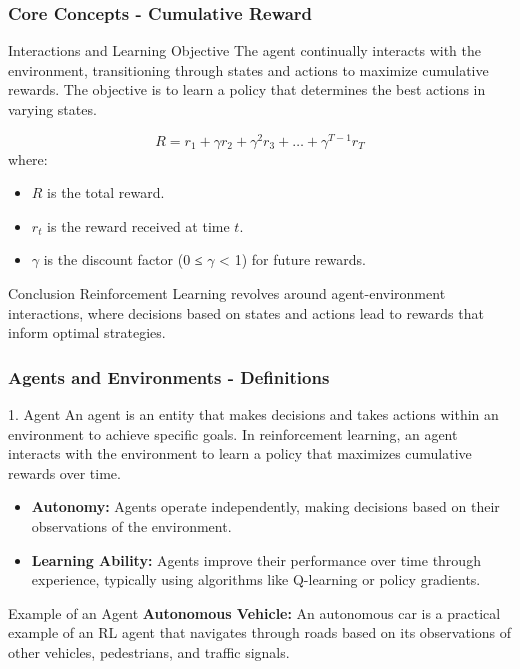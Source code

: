 \documentclass[aspectratio=169]{beamer}
\begin{document}
\begin{frame}[fragile]
    \frametitle{Core Concepts - Cumulative Reward}
    \begin{block}{Interactions and Learning Objective}
        The agent continually interacts with the environment, transitioning through states and actions to maximize cumulative rewards. The objective is to learn a policy that determines the best actions in varying states.
    \end{block}
    
    \begin{equation}
        R = r_1 + \gamma r_2 + \gamma^2 r_3 + \ldots + \gamma^{T-1} r_T
    \end{equation}
    where:
    \begin{itemize}
        \item \( R \) is the total reward.
        \item \( r_t \) is the reward received at time \( t \).
        \item \( \gamma \) is the discount factor (0 ≤ $\gamma$ < 1) for future rewards.
    \end{itemize}
    
    \begin{block}{Conclusion}
        Reinforcement Learning revolves around agent-environment interactions, where decisions based on states and actions lead to rewards that inform optimal strategies.
    \end{block}
\end{frame}

\begin{frame}[fragile]
    \frametitle{Agents and Environments - Definitions}
    
    \begin{block}{1. Agent}
        An agent is an entity that makes decisions and takes actions within an environment to achieve specific goals. In reinforcement learning, an agent interacts with the environment to learn a policy that maximizes cumulative rewards over time.
    \end{block}
    
    \begin{itemize}
        \item \textbf{Autonomy:} Agents operate independently, making decisions based on their observations of the environment.
        \item \textbf{Learning Ability:} Agents improve their performance over time through experience, typically using algorithms like Q-learning or policy gradients.
    \end{itemize}
    
    \begin{block}{Example of an Agent}
        \textbf{Autonomous Vehicle:} An autonomous car is a practical example of an RL agent that navigates through roads based on its observations of other vehicles, pedestrians, and traffic signals.
    \end{block}
\end{frame}
\end{document}
